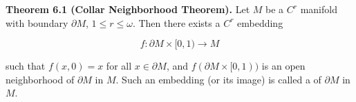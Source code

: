 \textbf{Theorem 6.1 (Collar Neighborhood Theorem).} Let $M$ be a $C^r$ manifold with boundary $\partial M$, $1 \leqslant r \leqslant \omega$. Then there exists a $C^r$ embedding

$$f: \partial M \times [0, 1) \rightarrow M$$

such that $f(x, 0) = x$ for all $x \in \partial M$, and $f(\partial M \times [0, 1))$ is an open neighborhood of $\partial M$ in $M$. Such an embedding (or its image) is called a  of $\partial M$ in $M$.
